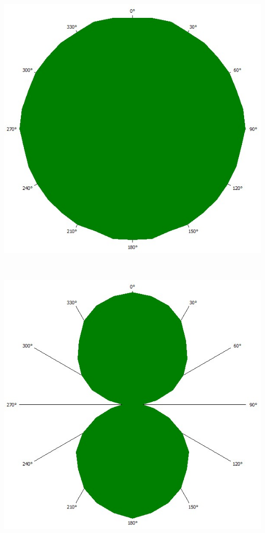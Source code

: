 \documentclass[german,  %
parskip=full,  %
]{scrartcl}
\begin{document}
\begin{minipage}{0.4 \textwidth} \centering
\includegraphics[scale=0.3]{445_l1_linker_Peak.jpg}
\end{minipage}
\begin{minipage}{0.2\textwidth}\centering
\
\end{minipage}
\begin{minipage}{0.4 \textwidth} \centering
\includegraphics[scale=0.3]{445_l1_rechter_Peak.jpg}
\end{minipage}
\end{document}
